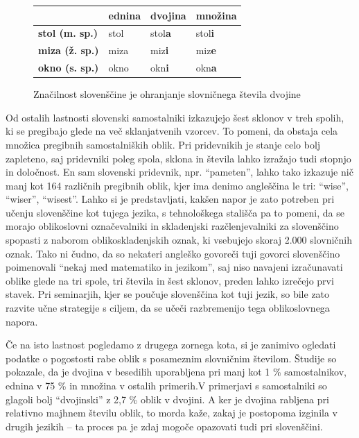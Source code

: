 \begin{multicols}{2}
\begin{figure}[htb]
\begin{tabularx}{\textwidth}{ |X|X|X|X| }
  \hline
   & \textbf{ednina} & \textbf{dvojina} & \textbf{množina} \\ 
  \hline
  \textbf{stol (m. sp.)}   & stol     &  stol\textbf{a}  & stol\textbf{i} \\ 
  \hline
  \textbf{miza (ž. sp.)}   & miza     &  miz\textbf{i}  & miz\textbf{e} \\ 
  \hline
  \textbf{okno (s. sp.)}   & okno     &  okn\textbf{i}  & okn\textbf{a} \\
  \hline
  \end{tabularx}
  \caption{Značilnost slovenščine je ohranjanje slovničnega števila dvojine}
  \label{fig:dvojina}
\end{figure}

Od ostalih lastnosti slovenski samostalniki izkazujejo šest sklonov v treh spolih, ki se pregibajo glede na več sklanjatvenih vzorcev. To pomeni, da obstaja cela množica pregibnih samostalniških oblik. Pri pridevnikih je stanje celo bolj zapleteno, saj pridevniki poleg spola, sklona in števila lahko izražajo tudi stopnjo in določnost. En sam slovenski pridevnik, npr. “pameten”, lahko tako izkazuje nič manj kot 164 različnih pregibnih oblik, kjer ima denimo angleščina le tri: ``wise'', ``wiser'', ``wisest''. Lahko si je predstavljati, kakšen napor je zato potreben pri učenju slovenščine kot tujega jezika, s tehnološkega stališča pa to pomeni, da se morajo oblikoslovni označevalniki in skladenjski razčlenjevalniki za slovenščino spopasti z naborom oblikoskladenjskih oznak, ki vsebujejo skoraj 2.000 slovničnih oznak. Tako ni čudno, da so nekateri angleško govoreči tuji govorci slovenščino poimenovali “nekaj med matematiko in jezikom”, saj niso navajeni izračunavati oblike glede na tri spole, tri števila in šest sklonov, preden lahko izrečejo prvi stavek. Pri seminarjih, kjer se poučuje slovenščina kot tuji jezik, so bile zato razvite učne strategije s ciljem, da se učeči razbremenijo tega oblikoslovnega napora. 

Če na isto lastnost pogledamo z drugega zornega kota, si je zanimivo ogledati podatke o pogostosti rabe oblik s posameznim slovničnim številom. Študije so pokazale, da je dvojina v besedilih uporabljena pri manj kot 1 \% samostalnikov, ednina v 75 \% in množina v ostalih primerih.V primerjavi s samostalniki so glagoli bolj “dvojinski” z 2,7 \% oblik v dvojini. A ker je dvojina rabljena pri relativno majhnem številu oblik, to morda kaže, zakaj je postopoma izginila v drugih jezikih – ta proces pa je zdaj mogoče opazovati tudi pri slovenščini.



\end{multicols}
